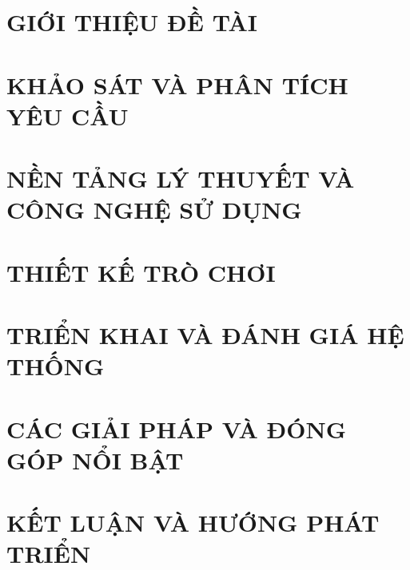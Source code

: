 \documentclass[a4paper,13pt,3p,twoside]{report}
\renewcommand{\bibname}{Danh_sach_tai_lieu_tham_khao}
\theoremstyle{definition}
\begin{document}
\newpage


\newpage



\newpage
{}

\pagestyle{fancy}
\fancyhf{}
\fancyhead[RE, LO]{\leftmark}
\fancyfoot[RE, LO]{\thepage}

\chapter{GIỚI THIỆU ĐỀ TÀI}
\label{chapter:Introduction}

\newpage
\chapter{KHẢO SÁT VÀ PHÂN TÍCH YÊU CẦU}
\label{chapter:Related_works}



\newpage
\chapter{NỀN TẢNG LÝ THUYẾT VÀ CÔNG NGHỆ SỬ DỤNG}
\label{chapter:Methodology}


\newpage
\chapter{THIẾT KẾ TRÒ CHƠI}
\label{chapter:GameDesign}


\newpage
\chapter{TRIỂN KHAI VÀ ĐÁNH GIÁ HỆ THỐNG}
\label{chapter:Experiment}


\newpage
\chapter{CÁC GIẢI PHÁP VÀ ĐÓNG GÓP NỔI BẬT}
\label{chapter:SolutionAndContribution}

\newpage
\chapter{KẾT LUẬN VÀ HƯỚNG PHÁT TRIỂN} %
\label{chapter:conclusion}



\newpage
\renewcommand\bibname{TÀI LIỆU THAM KHẢO}
\printbibliography
{}
\end{document}
